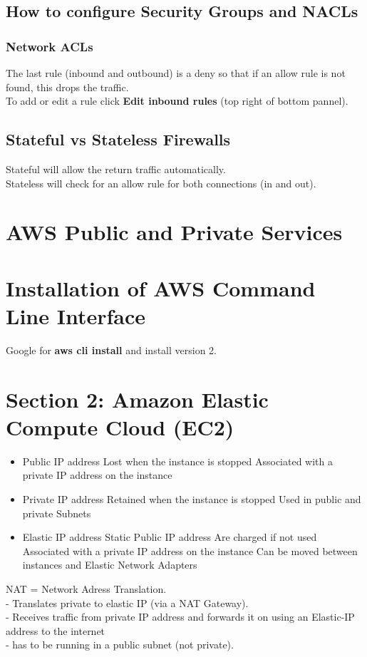 \documentclass[11pt]{article}
\begin{document}
    \subsection{How to configure Security Groups and NACLs}
    \subsubsection{Network ACLs}
    The last rule (inbound and outbound) is a deny so that if an allow rule is not found, this drops the traffic.
    \\
    To add or edit a rule click \textbf{Edit inbound rules} (top right of bottom pannel).

    \subsection{Stateful vs Stateless Firewalls}
    Stateful will allow the return traffic automatically.
    \\
    Stateless will check for an allow rule for both connections (in and out).

    \section{AWS Public and Private Services}

    \section{Installation of AWS Command Line Interface}
    Google for \textbf{aws cli install} and install version 2.

    \section{Section 2: Amazon Elastic Compute Cloud (EC2)}
    \begin{itemize}
        \item Public IP address
        \subitem Lost when the instance is stopped
        \subitem Associated with a private IP address on the instance
        \item Private IP address
        \subitem Retained when the instance is stopped
        \subitem Used in public and private Subnets
        \item Elastic IP address
        \subitem Static Public IP address
        \subitem Are charged if not used
        \subitem Associated with a private IP address on the instance
        \subitem Can  be moved between instances and Elastic Network Adapters
    \end{itemize}
    NAT = Network Adress Translation.
    \\
    - Translates private to elastic IP (via a NAT Gateway).
    \\
    - Receives traffic from private IP address and forwards it on using an Elastic-IP address to the internet
    \\
    - has to be  running in a public subnet (not private).
\end{document}
